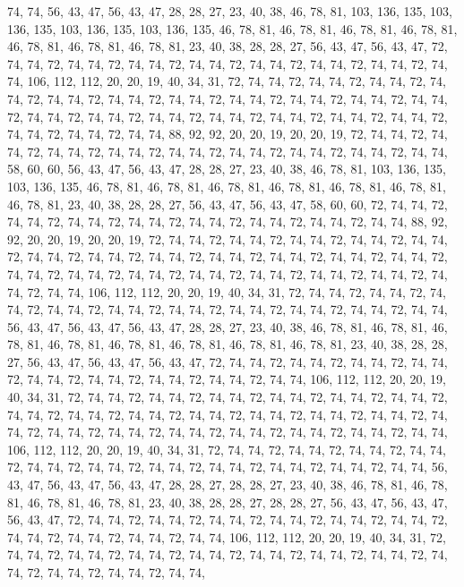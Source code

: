 74, 74, 56, 43, 47, 56, 43, 47, 28, 28, 27, 23, 40, 38, 46, 78, 81, 103, 136, 135, 103, 136, 135, 103, 136, 135, 103, 136, 135, 46, 78, 81, 46, 78, 81, 46, 78, 81, 46, 78, 81, 46, 78, 81, 46, 78, 81, 46, 78, 81, 23, 40, 38, 28, 28, 27, 56, 43, 47, 56, 43, 47, 72, 74,
74, 72, 74, 74, 72, 74, 74, 72, 74, 74, 72, 74, 74, 72, 74, 74, 72, 74, 74, 72, 74, 74, 106, 112, 112, 20, 20, 19, 40, 34, 31, 72, 74, 74, 72, 74, 74, 72, 74, 74, 72, 74, 74, 72, 74, 74, 72, 74, 74, 72, 74, 74, 72, 74, 74, 72, 74, 74, 72, 74, 74, 72, 74, 74,
72, 74, 74, 72, 74, 74, 72, 74, 74, 72, 74, 74, 72, 74, 74, 72, 74, 74, 72, 74, 74, 72, 74, 74, 72, 74, 74, 72, 74, 74, 88, 92, 92, 20, 20, 19, 20, 20, 19, 72, 74, 74, 72, 74, 74, 72, 74, 74, 72, 74, 74, 72, 74, 74, 72, 74, 74, 72, 74, 74, 72, 74, 74, 72,
74, 74, 58, 60, 60, 56, 43, 47, 56, 43, 47, 28, 28, 27, 23, 40, 38, 46, 78, 81, 103, 136, 135, 103, 136, 135, 46, 78, 81, 46, 78, 81, 46, 78, 81, 46, 78, 81, 46, 78, 81, 46, 78, 81, 46, 78, 81, 23, 40, 38, 28, 28, 27, 56, 43, 47, 56, 43, 47, 58, 60, 60, 72, 74,
74, 72, 74, 74, 72, 74, 74, 72, 74, 74, 72, 74, 74, 72, 74, 74, 72, 74, 74, 72, 74, 74, 88, 92, 92, 20, 20, 19, 20, 20, 19, 72, 74, 74, 72, 74, 74, 72, 74, 74, 72, 74, 74, 72, 74, 74, 72, 74, 74, 72, 74, 74, 72, 74, 74, 72, 74, 74, 72, 74, 74, 72, 74, 74,
72, 74, 74, 72, 74, 74, 72, 74, 74, 72, 74, 74, 72, 74, 74, 72, 74, 74, 72, 74, 74, 72, 74, 74, 72, 74, 74, 72, 74, 74, 106, 112, 112, 20, 20, 19, 40, 34, 31, 72, 74, 74, 72, 74, 74, 72, 74, 74, 72, 74, 74, 72, 74, 74, 72, 74, 74, 72, 74, 74, 72, 74, 74, 72,
74, 74, 72, 74, 74, 56, 43, 47, 56, 43, 47, 56, 43, 47, 28, 28, 27, 23, 40, 38, 46, 78, 81, 46, 78, 81, 46, 78, 81, 46, 78, 81, 46, 78, 81, 46, 78, 81, 46, 78, 81, 46, 78, 81, 23, 40, 38, 28, 28, 27, 56, 43, 47, 56, 43, 47, 56, 43, 47, 72, 74, 74, 72, 74,
74, 72, 74, 74, 72, 74, 74, 72, 74, 74, 72, 74, 74, 72, 74, 74, 72, 74, 74, 72, 74, 74, 106, 112, 112, 20, 20, 19, 40, 34, 31, 72, 74, 74, 72, 74, 74, 72, 74, 74, 72, 74, 74, 72, 74, 74, 72, 74, 74, 72, 74, 74, 72, 74, 74, 72, 74, 74, 72, 74, 74, 72, 74, 74,
72, 74, 74, 72, 74, 74, 72, 74, 74, 72, 74, 74, 72, 74, 74, 72, 74, 74, 72, 74, 74, 72, 74, 74, 72, 74, 74, 72, 74, 74, 106, 112, 112, 20, 20, 19, 40, 34, 31, 72, 74, 74, 72, 74, 74, 72, 74, 74, 72, 74, 74, 72, 74, 74, 72, 74, 74, 72, 74, 74, 72, 74, 74, 72,
74, 74, 72, 74, 74, 72, 74, 74, 56, 43, 47, 56, 43, 47, 56, 43, 47, 28, 28, 27, 28, 28, 27, 23, 40, 38, 46, 78, 81, 46, 78, 81, 46, 78, 81, 46, 78, 81, 23, 40, 38, 28, 28, 27, 28, 28, 27, 56, 43, 47, 56, 43, 47, 56, 43, 47, 72, 74, 74, 72, 74, 74, 72, 74,
74, 72, 74, 74, 72, 74, 74, 72, 74, 74, 72, 74, 74, 72, 74, 74, 72, 74, 74, 72, 74, 74, 106, 112, 112, 20, 20, 19, 40, 34, 31, 72, 74, 74, 72, 74, 74, 72, 74, 74, 72, 74, 74, 72, 74, 74, 72, 74, 74, 72, 74, 74, 72, 74, 74, 72, 74, 74, 72, 74, 74, 72, 74, 74,

